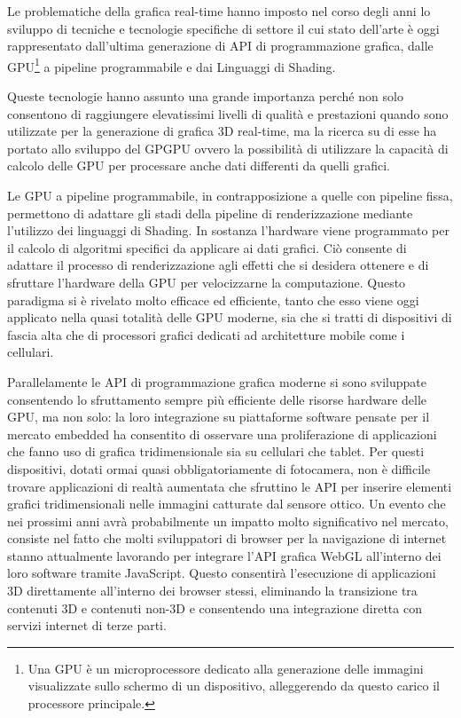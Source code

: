 Le problematiche della grafica real-time hanno imposto nel corso degli anni lo sviluppo di tecniche e tecnologie specifiche di settore il cui stato dell'arte \`e oggi rappresentato dall'ultima generazione di \ac{API} di programmazione grafica, dalle \ac{GPU}\footnote{Una \ac{GPU} \`e un microprocessore dedicato alla generazione delle immagini visualizzate sullo schermo di un dispositivo, alleggerendo da questo carico il processore principale.} a pipeline programmabile e dai Linguaggi di Shading.

Queste tecnologie hanno assunto una grande importanza perch\'e non solo consentono di raggiungere elevatissimi livelli di qualit\`a e prestazioni quando sono utilizzate per la generazione di grafica 3D real-time, ma la ricerca su di esse ha portato allo sviluppo del \ac{GPGPU} ovvero la possibilit\`a di utilizzare la capacit\`a di calcolo delle \ac{GPU} per processare anche dati differenti da quelli grafici.

Le \ac{GPU} a pipeline programmabile, in contrapposizione a quelle con pipeline fissa, permettono di adattare gli stadi della pipeline di renderizzazione mediante l'utilizzo dei linguaggi di Shading. In sostanza l'hardware viene programmato per il calcolo di algoritmi specifici da applicare ai dati grafici. Ci\`o consente di adattare il processo di renderizzazione agli effetti che si desidera ottenere e di sfruttare l'hardware della \ac{GPU} per velocizzarne la computazione. Questo paradigma si \`e rivelato molto efficace ed efficiente, tanto che esso viene oggi applicato nella quasi totalit\`a delle \ac{GPU} moderne, sia che si tratti di dispositivi di fascia alta che di processori grafici dedicati ad architetture mobile come i cellulari.

Parallelamente le \ac{API} di programmazione grafica moderne si sono sviluppate consentendo lo sfruttamento sempre pi\`u efficiente delle risorse hardware delle \ac{GPU}, ma non solo: la loro integrazione su piattaforme software pensate per il mercato embedded ha consentito di osservare una proliferazione di applicazioni che fanno uso di grafica tridimensionale sia su cellulari che tablet. Per questi dispositivi, dotati ormai quasi obbligatoriamente di fotocamera, non \`e difficile trovare applicazioni di realt\`a aumentata che sfruttino le \ac{API} per inserire elementi grafici tridimensionali nelle immagini catturate dal sensore ottico. Un evento che nei prossimi anni avr\`a probabilmente un impatto molto significativo nel mercato, consiste nel fatto che molti sviluppatori di browser per la navigazione di internet stanno attualmente lavorando per integrare l'\ac{API} grafica WebGL all'interno dei loro software tramite JavaScript. Questo consentir\`a l'esecuzione di applicazioni 3D direttamente all'interno dei browser stessi, eliminando la transizione tra contenuti 3D e contenuti non-3D e consentendo una integrazione diretta con servizi internet di terze parti.

